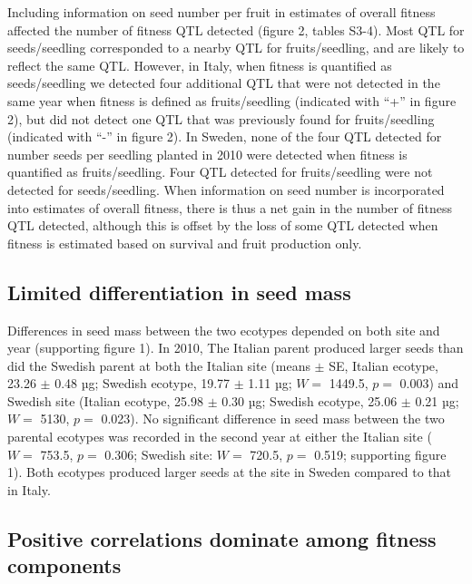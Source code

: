 \documentclass[]{article}
\begin{document}
Including information on seed number per fruit in estimates of overall fitness affected the number of fitness QTL detected (figure 2, tables S3-4). Most QTL for seeds/seedling corresponded to a nearby QTL for fruits/seedling, and are likely to reflect the same QTL. However, in Italy, when fitness is quantified as seeds/seedling we detected four additional QTL that were not detected in the same year when fitness is defined as fruits/seedling (indicated with ``+'' in figure 2), but did not detect one QTL that was previously found for fruits/seedling (indicated with ``-'' in figure 2). In Sweden, none of the four QTL detected for number seeds per seedling planted in 2010 were detected when fitness is quantified as fruits/seedling. Four QTL detected for fruits/seedling were not detected for seeds/seedling. When information on seed number is incorporated into estimates of overall fitness, there is thus a net gain in the number of fitness QTL detected, although this is offset by the loss of some QTL detected when fitness is estimated based on survival and fruit production only.

\hypertarget{limited-differentiation-in-seed-mass}{%
\subsection{Limited differentiation in seed mass}\label{limited-differentiation-in-seed-mass}}

Differences in seed mass between the two ecotypes depended on both site and year (supporting figure 1).
In 2010, The Italian parent produced larger seeds than did the Swedish parent at both the Italian site
(means \(\pm\) SE, Italian ecotype,
23.26
\(\pm\)
0.48
µg; Swedish ecotype,
19.77
\(\pm\)
1.11
µg;
\(W =\) 1449.5,
\(p=\) 0.003)
and Swedish site
(Italian ecotype,
25.98
\(\pm\)
0.30
µg; Swedish ecotype,
25.06
\(\pm\)
0.21
µg;
\(W =\) 5130,
\(p=\) 0.023).
No significant difference in seed mass between the two parental ecotypes was recorded in the second year at either the Italian site
(
\(W =\) 753.5, \(p=\) 0.306;
Swedish site:
\(W =\) 720.5, \(p=\) 0.519;
supporting figure 1).
Both ecotypes produced larger seeds at the site in Sweden compared to that in Italy.

\hypertarget{positive-correlations-dominate-among-fitness-components}{%
\subsection{Positive correlations dominate among fitness components}\label{positive-correlations-dominate-among-fitness-components}}
\end{document}
